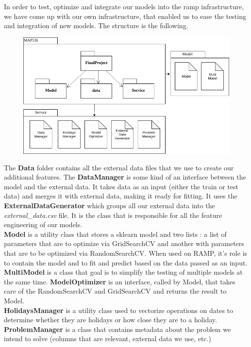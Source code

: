 \documentclass[a4paper,12pt,twoside]{article}
\begin{document}
In order to test, optimize and integrate our models into the ramp infrastructure, we have come up with our own infrastructure, that enabled us to ease the testing and integration of new models. The structure is the following.

\begin{figure}[H]
	\centering
	\includegraphics[scale=0.5]{UML.png}
\end{figure}

The \textbf{Data} folder contains all the external data files that we use to create our additional features. The \textbf{DataManager} is some kind of an interface between the model and the external data. It takes data as an input (either the train or test data) and merges it with external data, making it ready for fitting. It uses the \textbf{ExternalDataGenerator} which groups all our external data into the \textit{external\_data.csv} file. It is the class that is responsible for all the feature engineering of our models.\\
\textbf{Model} is a utility class that stores a sklearn model and two lists : a list of parameters that are to optimize via GridSearchCV and another with parameters that are to be optimized via RandomSearchCV. When used on RAMP, it's role is to contain the model and to fit and predict based on the data passed as an input. \textbf{MultiModel} is a class that goal is to simplify the testing of multiple models at the same time. \textbf{ModelOptimizer} is an interface, called by Model, that takes care of the RandomSearchCV and GridSearchCV and returns the result to Model.\\
\textbf{HolidaysManager} is a utility class used to vectorize operations on dates to determine whether they are holidays or how close they are to a holiday. \textbf{ProblemManager} is a class that contains metadata about the problem we intend to solve (columns that are relevant, external data we use, etc.)
\end{document}

